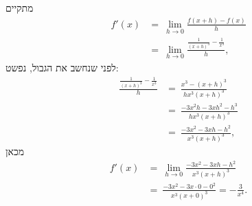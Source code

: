 \begin{solbox}
\bE
\item
מתקיים
\begin{align*}
    f'(x)&=\ \lim_{h\to0}\frac{f(x+h)-f(x)}{h}\\
    &=\ \lim_{h\to0}\frac{\tfrac{1}{(x+h)^3}-\tfrac{1}{x^3}}{h},
\end{align*}
לפני שנחשב את הגבול, נפשט:
\begin{align*}
    \frac{\tfrac{1}{(x+h)^3}-\tfrac{1}{x^3}}{h}&=\ \frac{x^3-(x+h)^3}{hx^3(x+h)^3}\\
    &=\ \frac{-3x^2h-3xh^2-h^3}{hx^3(x+h)^3}\\
    &=\ \frac{-3x^2-3xh-h^2}{x^3(x+h)^3},
\end{align*}
מכאן
\begin{align*}
    f'(x)&=\ \lim_{h\to0}\frac{-3x^2-3xh-h^2}{x^3(x+h)^3}\\
    &=\ \frac{-3x^2-3x\cdot0-0^2}{x^3(x+0)^3}= -\frac{3}{x^4}.
\end{align*}


\end{solbox}
